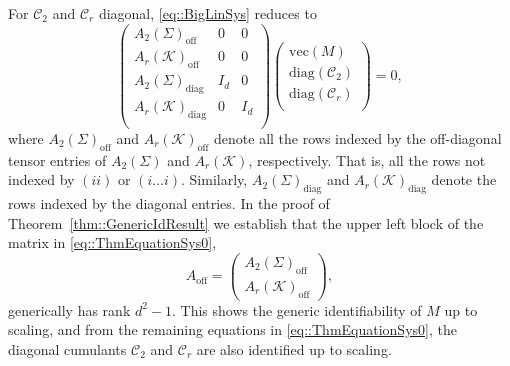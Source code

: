 \documentclass{biometrika}
\begin{document}
    For $\mathcal{C}_2$ and $\mathcal{C}_r$ diagonal, \eqref{eq::BigLinSys} reduces to 
    \begin{equation}
    \label{eq::ThmEquationSys0}
        \begin{pmatrix}
            A_2(\Sigma)_{\mathrm{off}} & 0 & 0 \\ 
            A_r(\mathcal{K} )_{\mathrm{off}} & 0 & 0 \\
            A_2(\Sigma)_{\mathrm{diag}} & I_{d} & 0 \\
            A_r(\mathcal{K} )_{\mathrm{diag}} & 0 & I_{d} \\ 
        \end{pmatrix} 
        \begin{pmatrix}
            \mathrm{vec}(M) \\
            \mathrm{diag}(\mathcal{C}_2 )\\
             \mathrm{diag}(\mathcal{C}_r)\\
        \end{pmatrix}
         = 0,
    \end{equation}
    where $A_2(\Sigma)_{\mathrm{off}}$ and $A_r(\mathcal{K} )_{\mathrm{off}}$ denote all the rows indexed by the off-diagonal tensor entries of $A_2(\Sigma)$ and $A_r(\mathcal{K} )$, respectively. That is, all the rows not indexed by $(ii)$ or $(i \dots i)$. Similarly, $A_2(\Sigma)_{\mathrm{diag}}$ and $A_r(\mathcal{K} )_{\mathrm{diag}}$ denote the rows indexed by the diagonal entries. In the proof of Theorem~\ref{thm::GenericIdResult}
    we establish that the upper left block of the matrix in \eqref{eq::ThmEquationSys0},
     \begin{equation}
        \label{eq:nd}
        A_{\mathrm{off}} = \begin{pmatrix}
            A_2(\Sigma)_{\mathrm{off}}\\ 
            A_r(\mathcal{K} )_{\mathrm{off}} 
        \end{pmatrix},
    \end{equation}
    generically has rank $d^2 - 1$. This shows the generic identifiability of $M$ up to scaling, 
    and from the remaining equations in \eqref{eq::ThmEquationSys0}, the diagonal cumulants $\mathcal{C}_2$
    and $\mathcal{C}_r$ are also identified up to scaling. 
\end{document}
